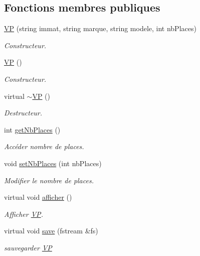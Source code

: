 \subsection*{Fonctions membres publiques}
\begin{DoxyCompactItemize}
\item 
\hyperlink{class_v_p_a4bde97e27db770144037907d2eb0d081}{VP} (string immat, string marque, string modele, int nbPlaces)
\begin{DoxyCompactList}\small\item\em Constructeur. \item\end{DoxyCompactList}\item 
\hyperlink{class_v_p_ad67a48c8f2f8d3cc8466431d4e0c2949}{VP} ()
\begin{DoxyCompactList}\small\item\em Constructeur. \item\end{DoxyCompactList}\item 
virtual \hyperlink{class_v_p_ae9afa0cd76ea91730282e2ae82d0e203}{$\sim$VP} ()
\begin{DoxyCompactList}\small\item\em Destructeur. \item\end{DoxyCompactList}\item 
int \hyperlink{class_v_p_a6e6a4443cb9f83e0d94e3459b70bd73d}{getNbPlaces} ()
\begin{DoxyCompactList}\small\item\em Accéder nombre de places. \item\end{DoxyCompactList}\item 
void \hyperlink{class_v_p_a678d522ed1085e94814660d93edd9e7c}{setNbPlaces} (int nbPlaces)
\begin{DoxyCompactList}\small\item\em Modifier le nombre de places. \item\end{DoxyCompactList}\item 
virtual void \hyperlink{class_v_p_a3af04349e81a3c643b497898ad19ef7a}{afficher} ()
\begin{DoxyCompactList}\small\item\em Afficher \hyperlink{class_v_p}{VP}. \item\end{DoxyCompactList}\item 
virtual void \hyperlink{class_v_p_a3fe677e58cb952b7784d5f661ef426e6}{save} (fstream \&fs)
\begin{DoxyCompactList}\small\item\em sauvegarder \hyperlink{class_v_p}{VP} \item\end{DoxyCompactList}\end{DoxyCompactItemize}


